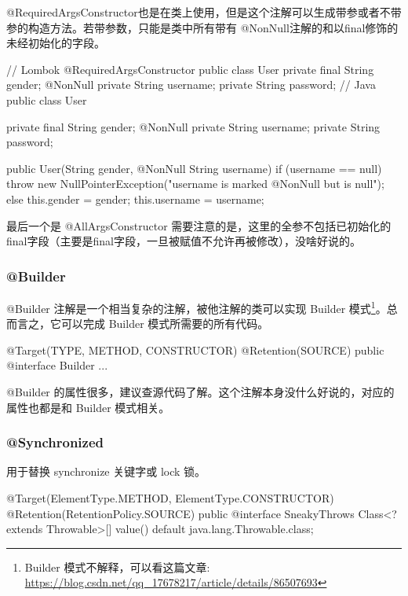 @RequiredArgsConstructor也是在类上使用，但是这个注解可以生成带参或者不带参的构造方法。若带参数，只能是类中所有带有 @NonNull注解的和以final修饰的未经初始化的字段。

\begin{Java}
// Lombok
@RequiredArgsConstructor
public class User {
    private final String gender;
    @NonNull
    private String username;
    private String password;
}
// Java
public class User {
    private final String gender;
    @NonNull
    private String username;
    private String password;

    public User(String gender, @NonNull String username) {
        if (username == null) {
            throw new NullPointerException("username is marked @NonNull but is null");
        } else {
            this.gender = gender;
            this.username = username;
        }
    }
}
\end{Java}

最后一个是 @AllArgsConstructor 需要注意的是，这里的全参不包括已初始化的final字段（主要是final字段，一旦被赋值不允许再被修改），没啥好说的。

\subsubsection{@Builder}

@Builder 注解是一个相当复杂的注解，被他注解的类可以实现 Builder 模式\footnote{Builder 模式不解释，可以看这篇文章: \url{https://blog.csdn.net/qq_17678217/article/details/86507693}}。总而言之，它可以完成 Builder 模式所需要的所有代码。

\begin{Java}
@Target({TYPE, METHOD, CONSTRUCTOR})
@Retention(SOURCE)
public @interface Builder {
    ...
}
\end{Java}

@Builder 的属性很多，建议查源代码了解。这个注解本身没什么好说的，对应的属性也都是和 Builder 模式相关。

\subsubsection{@Synchronized}

用于替换 synchronize 关键字或 lock 锁。

\begin{Java}
@Target({ElementType.METHOD, ElementType.CONSTRUCTOR})
@Retention(RetentionPolicy.SOURCE)
public @interface SneakyThrows {
	Class<? extends Throwable>[] value() default java.lang.Throwable.class;
}
\end{Java}

